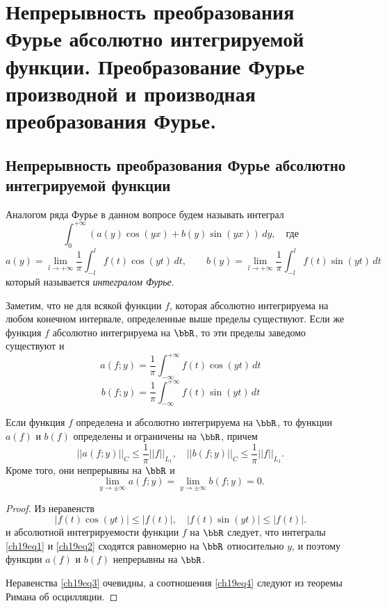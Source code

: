 \chapter{Непрерывность преобразования Фурье абсолютно интегрируемой функции. Преобразование Фурье производной и производная преобразования Фурье.}

\section{Непрерывность преобразования Фурье абсолютно интегрируемой функции}

Аналогом ряда Фурье в данном вопросе будем называть интеграл
$$
\int_{0}^{+\infty} (a(y)\cos(yx) + b(y)\sin(yx))\,dy,\quad \text{где}
$$
$$
a(y) = \lim_{l \to +\infty}\frac{1}{\pi}\int_{-l}^{l} f(t)\cos(yt)\,dt,\qquad 
b(y) = \lim_{l \to +\infty}\frac{1}{\pi}\int_{-l}^{l} f(t)\sin(yt)\,dt
$$
который называется \textit{интегралом Фурье}.

Заметим, что не для всякой функции $f$, которая абсолютно интегрируема на любом конечном интервале, определенные выше пределы существуют. Если же функция $f$ абсолютно интегрируема на $\bbR$, то эти пределы заведомо существуют и
\begin{equation} \label{ch19eq1}
a(f;y) = \frac{1}{\pi}\int_{-\infty}^{+\infty} f(t)\cos(yt)\,dt
\end{equation}
\begin{equation} \label{ch19eq2}
b(f;y) = \frac{1}{\pi}\int_{-\infty}^{+\infty} f(t)\sin(yt)\,dt
\end{equation}

\begin{thm}
Если функция $f$ определена и абсолютно интегрируема на $\bbR$, то функции $a(f)$ и $b(f)$ определены и ограничены на $\bbR$, причем
\begin{equation} \label{ch19eq3}
||a(f;y)||_C \le \frac{1}{\pi}||f||_{L_{1}}, \quad ||b(f;y)||_C \le \frac{1}{\pi}||f||_{L_{1}}.
\end{equation}
Кроме того, они непрерывны на $\bbR$ и
\begin{equation} \label{ch19eq4}
\lim_{y \to \pm\infty} a(f;y) = \lim_{y \to \pm\infty} b(f;y) = 0.
\end{equation}
\end{thm}
\begin{proof}
Из неравенств
$$
|f(t)\cos(yt)| \le |f(t)|, \quad |f(t)\sin(yt)| \le |f(t)|.
$$
и абсолютной интегрируемости функции $f$ на $\bbR$ следует, что интегралы \eqref{ch19eq1} и \eqref{ch19eq2} сходятся равномерно на $\bbR$ относительно $y$, и поэтому функции $a(f)$ и $b(f)$ непрерывны на $\bbR$.

Неравенства \eqref{ch19eq3} очевидны, а соотношения \eqref{ch19eq4} следуют из теоремы Римана об осцилляции. 
\end{proof}

